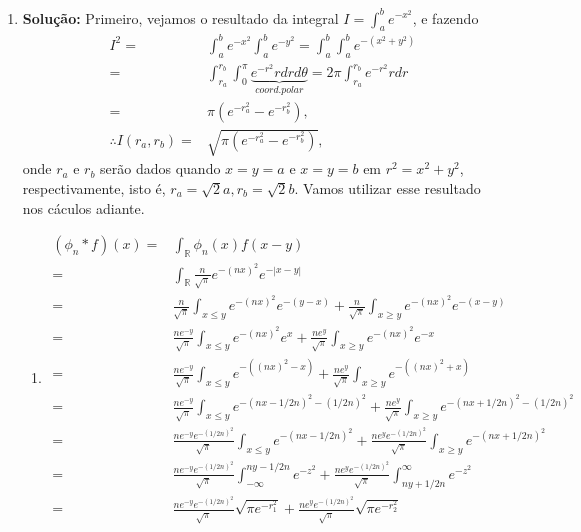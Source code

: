 \documentclass{article}
\begin{document}
\begin{enumerate}
		\item \textbf{Solução:} Primeiro, vejamos o resultado da integral $I = \int_{a}^{b} e^{-x^{2}}$, e fazendo 
		$$
		\begin{aligned}
		I^{2} = & \int_{a}^{b} e^{-x^{2}}\int_{a}^{b} e^{-y^{2}} = \int_{a}^{b} \int_{a}^{b} e^{-(x^{2}+y^{2})} 
		\\
		= & \int_{r_{a}}^{r_{b}} \int_{0}^{\pi} \underbrace{ e^{-r^{2}}r dr d\theta }_{coord. polar} = 2\pi \int_{r_{a}}^{r_{b}} e^{-r^{2}}r dr
		\\
		= & \pi (e^{-r_{a}^{2}} - e^{-r_{b}^{2}}),
		\\
		\therefore I(r_{a}, r_{b}) = & \sqrt{\pi (e^{-r_{a}^{2}} - e^{-r_{b}^{2}})},
		\end{aligned}
		$$
		onde $r_{a}$ e $r_{b}$ serão dados quando $x=y=a$ e $x=y=b$ em  $r^{2} = x^{2}+y^{2}$, respectivamente, isto é, $r_{a} = \sqrt{2}a, r_{b} = \sqrt{2}b$. Vamos utilizar esse resultado nos cáculos adiante.
			\begin{enumerate}
				\item
					$$
					\begin{aligned}
					(\phi_{n}*f)(x) = &\int_{\mathbb{R}} \phi_{n}(x)f(x-y)
					\\
					= &\int_{\mathbb{R}} \frac{n}{\sqrt{\pi}}e^{-(nx)^{2}} e^{-|x-y|}
					\\
					= & \frac{n}{\sqrt{\pi}}\int_{x \leq y} e^{-(nx)^{2}} e^{-(y-x)} + \frac{n}{\sqrt{\pi}}\int_{x \geq y} e^{-(nx)^{2}} e^{-(x-y)}
					\\
					= & \frac{ne^{-y}}{\sqrt{\pi}}\int_{x \leq y} e^{-(nx)^{2}} e^{x} + \frac{ne^{y}}{\sqrt{\pi}}\int_{x \geq y} e^{-(nx)^{2}} e^{-x}
					\\
					= & \frac{ne^{-y}}{\sqrt{\pi}}\int_{x \leq y} e^{-((nx)^{2} -x)}  + \frac{ne^{y}}{\sqrt{\pi}}\int_{x \geq y} e^{-((nx)^{2}+x)}
					\\
					= & \frac{ne^{-y}}{\sqrt{\pi}}\int_{x \leq y} e^{-(nx - 1/2n)^{2} - (1/2n)^{2}} + \frac{ne^{y}}{\sqrt{\pi}}\int_{x \geq y} e^{-(nx + 1/2n)^{2} - (1/2n)^{2}}
					\\
					= & \frac{ne^{-y}e^{- (1/2n)^{2}}}{\sqrt{\pi}}\int_{x \leq y} e^{-(nx - 1/2n)^{2}} + \frac{ne^{y}e^{ - (1/2n)^{2}}}{\sqrt{\pi}}\int_{x \geq y} e^{-(nx + 1/2n)^{2}}
					\\
					= & \frac{ne^{-y}e^{- (1/2n)^{2}}}{\sqrt{\pi}} \int_{-\infty}^{ny-1/2n} e^{-z^{2}} + \frac{ne^{y}e^{ - (1/2n)^{2}}}{\sqrt{\pi}}\int_{ny+1/2n}^{\infty} e^{-z^{2}}
					\\
					= & \frac{ne^{-y}e^{- (1/2n)^{2}}}{\sqrt{\pi}} \sqrt{\pi e^{-r_{1}^{2}}} + \frac{ne^{y}e^{ - (1/2n)^{2}}}{\sqrt{\pi}}\sqrt{\pi e^{-r_{2}^{2}}}

\end{aligned}$$
\end{enumerate}
\end{enumerate}
\end{document}
